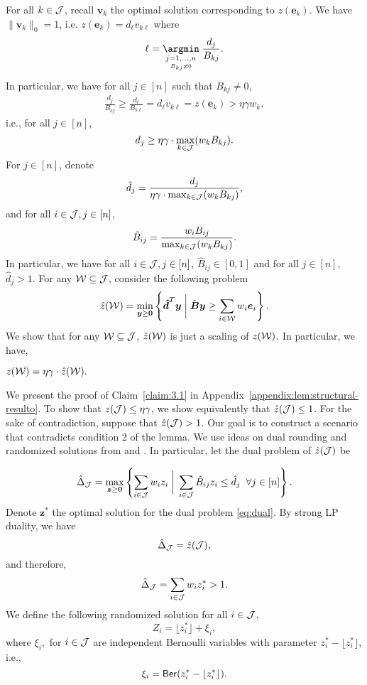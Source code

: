 \documentclass[moor]{informs1}              %
\newcommand{\mb}[1]{\ensuremath{\boldsymbol{#1}}}
\newcommand*{\red}{\textcolor{black}}
\begin{document}
For all $k \in  {\cal J} $, recall ${\mb v}_k$ the optimal solution corresponding to $z(\mb e_k)$. We have  $\|  {\mb v}_k \|_0 =1$, i.e. $ z(\mb e_k) = d_{\ell} { v}_{k\ell}$ where 
$$ \ell = \underset{ \underset {B_{kj} \neq 0} {j=1,\ldots,n}} \argmin  \; \frac{d_j}{B_{kj}}.$$
In particular, we have for all $j \in [n]$ such that $B_{kj} \neq 0$, 
\begin{align*}
\frac{d_j}{B_{kj}} \geq \frac{d_{\ell}}{B_{k{\ell}}} = d_{\ell} v_{k\ell} = z(\mb e_k) > \eta \gamma w_k,
\end{align*}
i.e., for all $j \in [n]$,
\red{$$d_j \geq \eta \gamma \cdot \max_{k \in {\cal J}}  (w_k B_{kj} )  .$$} 
For $j \in [n]$, denote
\red{$$\hat{d}_j = \frac{d_j}{ \eta \gamma \cdot \max_{k \in {\cal J}} (w_k B_{kj})}, $$}
and  for all $i \in {\cal J} ,j \in [n]$,
\red{$$ \hat{B}_{ij}= \frac{w_i B_{ij}}{\max_{k \in {\cal J}} (w_k B_{kj})}.$$}
In particular, we have for all $i \in {\cal J} ,j \in [n]$, $\hat{B}_{ij} \in [0,1]$ and for all $j \in [n]$, $\hat{d}_j >1$. For any $ {\cal W} \subseteq {\cal J}$, consider the following problem
\begin{equation}\label{eq:one-stage-hat}
 \hat z({\cal W})  = \min_{\mb y \geq \mb 0 } \left\{ \mb{\hat{d}}^T \mb y \; \bigg\vert \; \hat{\mb B} \mb y \geq \sum_{ i \in {\cal W}}  w_i \mb  e_i   \right\}.
\end{equation}
We show that for any $ {\cal W} \subseteq {\cal J}$, $ \hat{z}({\cal W} )$ is just a scaling of $z({\cal W}) $. In particular, we have, 

\begin{claim}\label{claim:3.1} 
$z({\cal W}) = \eta \gamma \cdot  \hat{z}({\cal W} ) .$
\end{claim}

\vspace{1mm}
\noindent
We present the proof of Claim~\ref{claim:3.1} in Appendix~\ref{appendix:lem:structural-resulto}. To show that $z({\cal J}) \leq \eta \gamma$\red{, we} show equivalently that   $  \hat{z}({\cal J} )  \leq 1 $. For the sake of contradiction, suppose that $ \hat{z}({\cal J})  >1$. Our goal is to construct a scenario that contradicts condition 2 of the lemma. We use ideas on dual rounding and randomized solutions from \cite{FJMM07} and \cite{gupta2014thresholded}.
In particular, let the dual  problem of $\hat{z}({\cal J})$ be

\begin{equation}\label{eq:dual}
\hat{\Delta}_{\cal J}= \max_{\mb z \geq \mb 0}  \left\{ \sum_{ i \in {\cal J}} w_i z_i \; \bigg\vert \;   \sum_{ i \in {\cal J}} \hat{B}_{ij} z_i \leq \hat{d}_j \; \; \forall j \in [n]   \right\}.
\end{equation}
Denote $ \mb{z^*}$ the optimal solution for the dual problem \eqref{eq:dual}. By strong LP duality, we have $$ \hat{\Delta}_{\cal J} = \hat{z}({\cal J}),$$ and therefore,    
$$ \hat{\Delta}_{\cal J}=  \sum_{i \in {\cal J}}  w_i z^*_i > 1.$$
We define the following randomized solution for all $ i \in {\cal J}$,
$$ Z_i = \lfloor{z_i^*}\rfloor + {\xi}_i,  $$
where ${\xi}_i,$ for $ i \in {\cal J}$ are independent Bernoulli variables with parameter $z_i^*- \lfloor{z_i^*}\rfloor$, i.e., 
$$ {\xi}_i ={\sf  Ber} ( z_i^*- \lfloor{z_i^*}\rfloor ).$$
\end{document}
